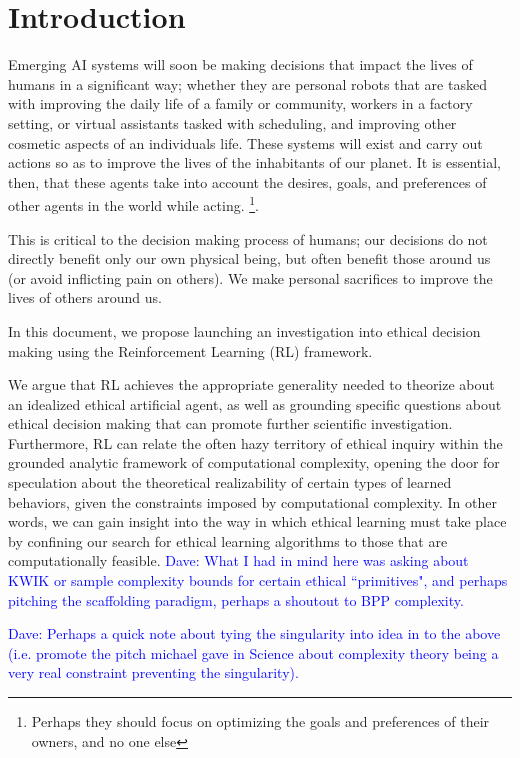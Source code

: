 \documentclass[11pt]{article}
\newcommand\davenote[1]{\textcolor{blue}{Dave: #1}}
\begin{document}
\section{Introduction}

Emerging AI systems will soon be making decisions that impact the lives of humans in a significant way; whether they are personal robots that are tasked with improving the daily life of a family or community,  workers in a factory setting, or virtual assistants tasked with scheduling, and improving other cosmetic aspects of an individuals life.
These systems will exist and carry out actions so as to improve the lives of the inhabitants of our planet.
It is essential, then, that these agents take into account the desires, goals, and preferences of other agents in the world while acting. \footnote{Perhaps they should focus on optimizing the goals and preferences of their owners, and no one else}.

This is critical to the decision making process of humans; our decisions do not directly benefit only our own physical being, but often benefit those around us (or avoid inflicting pain on others). We make personal sacrifices to improve the lives of others around us.

In this document, we propose launching an investigation into ethical decision making using the Reinforcement Learning (RL) framework.

We argue that RL achieves the appropriate generality needed to theorize about an idealized ethical artificial agent, as well as grounding specific questions about ethical decision making that can promote further scientific investigation.
Furthermore, RL can relate the often hazy territory of ethical inquiry within the grounded analytic framework of computational complexity, opening the door for speculation about the theoretical realizability of certain types of learned behaviors, given the constraints imposed by computational complexity.
In other words, we can gain insight into the way in which ethical learning must take place by confining our search for ethical learning algorithms to those that are computationally feasible. \davenote{What I had in mind here was asking about KWIK or sample complexity bounds for certain ethical ``primitives", and perhaps pitching the scaffolding paradigm, perhaps a shoutout to BPP complexity.}

\davenote{Perhaps a quick note about tying the singularity into idea in to the above (i.e. promote the pitch michael gave in Science about complexity theory being a very real constraint preventing the singularity).}
\end{document}
